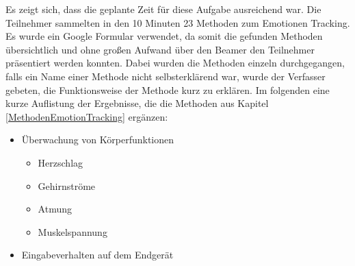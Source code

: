 Es zeigt sich, dass die geplante Zeit für diese Aufgabe ausreichend war. Die Teilnehmer sammelten in den 10 Minuten 23 Methoden zum Emotionen Tracking. Es wurde ein Google Formular verwendet, da somit die gefunden Methoden übersichtlich und ohne großen Aufwand über den Beamer den Teilnehmer präsentiert werden konnten. Dabei wurden die Methoden einzeln durchgegangen, falls ein Name einer Methode nicht selbsterklärend war, wurde der Verfasser gebeten, die Funktionsweise der Methode kurz zu erklären. Im folgenden eine kurze Auflistung der Ergebnisse, die die Methoden aus Kapitel \ref{MethodenEmotionTracking} ergänzen:

\begin{itemize}
	\item Überwachung von Körperfunktionen
	\begin{itemize}
		\item Herzschlag
		\item Gehirnströme
		\item Atmung
		\item Muskelspannung
	\end{itemize}
	\item Eingabeverhalten auf dem Endgerät	
\end{itemize}

